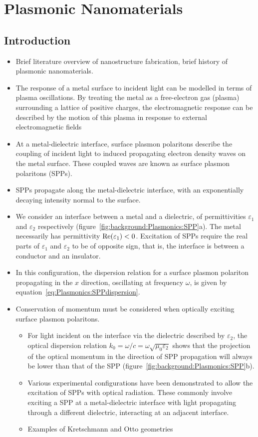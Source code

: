 \chapter{Plasmonic Nanomaterials}\label{sec:background:Plasmonics}

\section{Introduction}
\begin{itemize}
    \item Brief literature overview of nanostructure fabrication, brief history of plasmonic nanomaterials.
    \item The response of a metal surface to incident light can be modelled in terms of plasma oscillations. By treating the metal as a free-electron gas (plasma) surrounding a lattice of positive charges, the electromagnetic response can be described by the motion of this plasma in response to external electromagnetic fields
    \item At a metal-dielectric interface, surface plasmon polaritons describe the coupling of incident light to induced propagating electron density waves on the metal surface. These coupled waves are known as surface plasmon polaritons (SPPs).
    \item SPPs propagate along the metal-dielectric interface, with an exponentially decaying intensity normal to the surface.
    \item We consider an interface between a metal and a dielectric, of permittivities $\varepsilon_1$ and $\varepsilon_2$ respectively (figure~\ref{fig:background:Plasmonics:SPP}a). The metal necessarily has permittivity ${\mathop{\rm Re}\nolimits}(\varepsilon_1)<0$. Excitation of SPPs require the real parts of $\varepsilon_1$ and $\varepsilon_2$ to be of opposite sign, that is, the interface is between a conductor and an insulator.
    \item In this configuration, the dispersion relation for a surface plasmon polariton propagating in the $x$ direction, oscillating at frequency $\omega$, is given by equation~\ref{eq:Plasmonics:SPPdispersion}.
    \item Conservation of momentum must be considered when optically exciting surface plasmon polaritons.
    \begin{itemize}
        \item For light incident on the interface via the dielectric described by $\varepsilon_2$, the optical dispersion relation $k_0 = \omega / c = \omega \sqrt{\mu_0 \varepsilon_2}$ shows that the projection of the optical momentum in the direction of SPP propagation will always be lower than that of the SPP (figure~\ref{fig:background:Plasmonics:SPP}b).
        \item Various experimental configurations have been demonstrated to allow the excitation of SPPs with optical radiation. These commonly involve exciting a SPP at a metal-dielectric interface with light propagating through a different dielectric, interacting at an adjacent interface.
        \item Examples of Kretschmann and Otto geometries
    \end{itemize}
\end{itemize}

